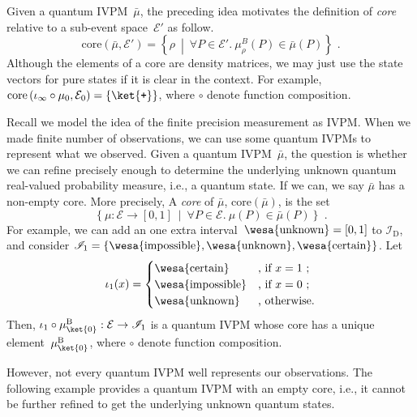 \documentclass[english,reprint, aps, prl,superscriptaddress, showpacs,
showkeys, longbibliography, amsmath, amssymb]{revtex4-1}
\theoremstyle{plain}
\theoremstyle{definition}
\newcommand{\events}{\ensuremath{\mathcal{E}}}
\newcommand{\pmeas}{\ensuremath{\mu}}
\newcommand{\imposs}{{\text{\wesa{impossible}}}}
\newcommand{\necess}{{\text{\wesa{certain}}}}
\newcommand{\unknown}{{\text{\wesa{unknown}}}}
\newcommand{\ps}{\texttt{+}}
\newcommand{\set}[2]{\ensuremath{\left\{ {#1}~\middle|~{#2}\right\} }}
\begin{document}
Given a quantum IVPM~$\bar{\mu}$, the preceding idea motivates the
definition of \emph{core} relative to a sub-event space~$\events'$
as follow.
\begin{equation}
\mathrm{core}\left(\bar{\mu},\events'\right)=\set{\rho}{\forall P\in\events'.~\mu_{\rho}^{B}\left(P\right)\in\bar{\mu}\left(P\right)}\textrm{ .}
\end{equation}
Although the elements of a core are density matrices, we may just
use the state vectors for pure states if it is clear in the context.
For example, $\mathrm{core}\left(\iota_{\infty}\circ\mu_{0},\events_{0}\right)=\left\{ \ket{\ps}\right\} $,
where $\circ$ denote function composition.\newpage{}

Recall we model the idea of the finite precision measurement as IVPM.
When we made finite number of observations, we can use some quantum
IVPMs to represent what we observed. Given a quantum IVPM~$\bar{\mu}$,
the question is whether we can refine precisely enough to determine
the underlying unknown quantum real-valued probability measure, i.e.,
a quantum state. If we can, we say $\bar{\mu}$ has a non-empty core.
More precisely, A \emph{core} of $\bar{\mu}$, $\mathrm{core}\left(\bar{\mu}\right)$,
is the set 
\begin{equation}
\set{\pmeas:\events\rightarrow[0,1]}{\forall P\in\events.~\pmeas\left(P\right)\in\bar{\mu}\left(P\right)}\textrm{ .}
\end{equation}
For example, we can add an one extra interval~$\unknown=\left[0,1\right]$
to $\mathscr{I}_{\mathrm{D}}$, and consider $\mathscr{I}_{1}=\left\{ \imposs,\unknown,\necess\right\} $.
Let 
\begin{equation}
\iota_{1}(x)=\begin{cases}
\necess & \text{, if }x=1\text{ ;}\\
\imposs & \text{, if }x=0\text{ ;}\\
\unknown & \text{, otherwise.}
\end{cases}\label{eq:homomorphism-1}
\end{equation}
Then, $\iota_{1}\circ\mu_{\ket{0}}^{\mathrm{B}}:\events\rightarrow\mathscr{I}_{1}$
is a quantum IVPM whose core has a unique element~$\mu_{\ket{0}}^{\mathrm{B}}$,
where $\circ$ denote function composition.

However, not every quantum IVPM well represents our observations.
The following example provides a quantum IVPM with an empty core,
i.e., it cannot be further refined to get the underlying unknown quantum
states.
\end{document}
